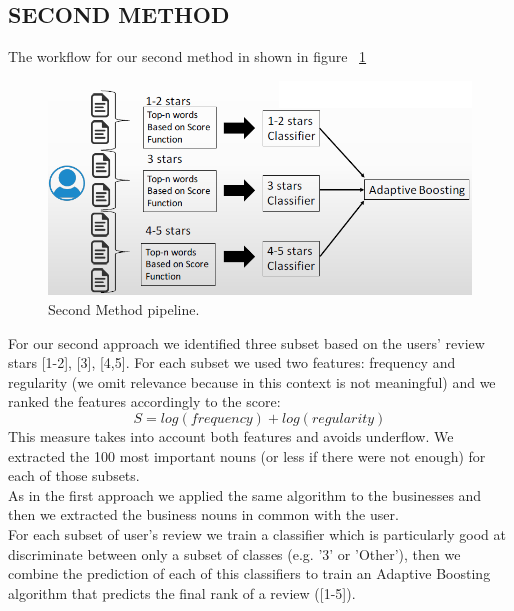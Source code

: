 \documentclass[11pt]{article}
\begin{document}
\subsection{SECOND METHOD}
The workflow for our second method in shown in figure ~\ref{second}
\begin{figure}[thpb]
	\includegraphics[scale=0.35]{img/secondMethod.png}
	\caption{Second Method pipeline.}
	\label{second}
\end{figure}	
For our second approach we identified three subset based on the users' review stars [1-2], [3], [4,5]. For each subset we used two features: frequency and regularity (we omit relevance because in this context is not meaningful) and we ranked the features accordingly to the score:\[ S=log(frequency)+log(regularity) \]
This measure takes into account both features and avoids underflow.
We extracted the 100 most important nouns (or less if there were not enough) for each of those subsets.\\
As in the first approach we applied the same algorithm to the businesses and then we extracted the business nouns in common with the user.\\
For each subset of user's review we train a classifier which is particularly good at discriminate between only a subset of classes (e.g. '3' or 'Other'), then we combine the prediction of each of this classifiers to train an Adaptive Boosting algorithm that predicts the final rank of a review ([1-5]).
\end{document}
